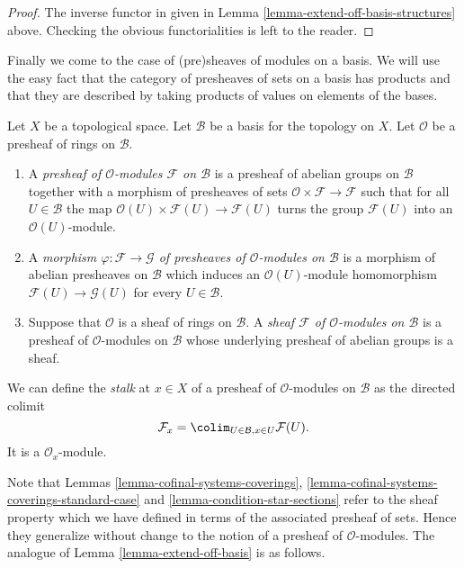 \begin{proof}
The inverse functor in given in
Lemma \ref{lemma-extend-off-basis-structures} above.
Checking the obvious functorialities is left to the
reader.
\end{proof}

\noindent
Finally we come to the case of (pre)sheaves of modules
on a basis. We will use the easy fact that the category
of presheaves of sets on a basis has products and that
they are described by taking products of values on
elements of the bases.

\begin{definition}
\label{definition-sheaf-modules-basis}
Let $X$ be a topological space. Let $\mathcal{B}$ be a
basis for the topology on $X$. Let $\mathcal{O}$ be
a presheaf of rings on $\mathcal{B}$.
\begin{enumerate}
\item A {\it presheaf of $\mathcal{O}$-modules $\mathcal{F}$
on $\mathcal{B}$} is a presheaf of abelian groups on
$\mathcal{B}$ together with a morphism of presheaves
of sets $\mathcal{O} \times \mathcal{F} \to \mathcal{F}$
such that for all $U \in \mathcal{B}$ the map
$\mathcal{O}(U) \times \mathcal{F}(U) \to \mathcal{F}(U)$
turns the group $\mathcal{F}(U)$ into an $\mathcal{O}(U)$-module.
\item A {\it morphism $\varphi : \mathcal{F} \to \mathcal{G}$
of presheaves of $\mathcal{O}$-modules on $\mathcal{B}$}
is a morphism of abelian presheaves on $\mathcal{B}$
which induces an $\mathcal{O}(U)$-module homomorphism
$\mathcal{F}(U) \to \mathcal{G}(U)$ for every $U \in \mathcal{B}$.
\item Suppose that $\mathcal{O}$ is a sheaf of rings
on $\mathcal{B}$. A {\it sheaf $\mathcal{F}$ of $\mathcal{O}$-modules
on $\mathcal{B}$} is a presheaf of $\mathcal{O}$-modules
on $\mathcal{B}$ whose underlying presheaf of abelian groups
is a sheaf.
\end{enumerate}
\end{definition}

\noindent
We can define the {\it stalk} at $x \in X$
of a presheaf of $\mathcal{O}$-modules on $\mathcal{B}$
as the directed colimit
$$
\mathcal{F}_x = \colim_{U\in \mathcal{B}, x\in U} \mathcal{F}(U).
$$
It is a $\mathcal{O}_x$-module.

\medskip\noindent
Note that Lemmas \ref{lemma-cofinal-systems-coverings},
\ref{lemma-cofinal-systems-coverings-standard-case} and
\ref{lemma-condition-star-sections} refer to the sheaf
property which we have defined in terms of the associated presheaf
of sets. Hence they generalize without change to the notion
of a presheaf of $\mathcal{O}$-modules. The analogue of
Lemma \ref{lemma-extend-off-basis} is as follows.

